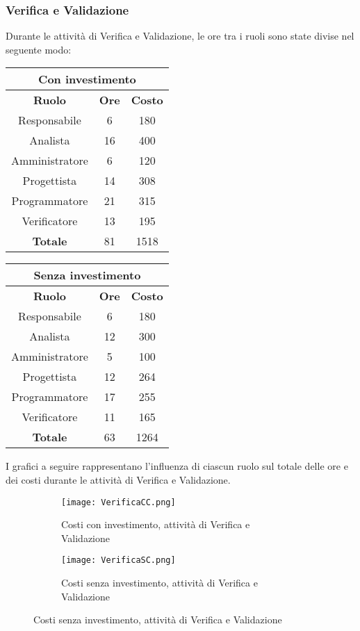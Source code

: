 \documentclass{scalatekids-article}
\begin{document}
\subsubsection{Verifica e Validazione}
Durante le attività di Verifica e Validazione, le ore tra i ruoli sono state divise nel seguente modo:
\begin{center}
  \normalsize
  \begin{tabular}{| c | c | c |}
    \hline
    \multicolumn{3}{|c|}{\textbf{Con investimento}}\\
    \hline
    \textbf{Ruolo} & \textbf{Ore} & \textbf{Costo}\\
    \hline
    Responsabile & 6 & 180 \\
    Analista & 16 & 400\\
    Amministratore & 6 & 120\\
    Progettista & 14 & 308\\
    Programmatore & 21 & 315\\
    Verificatore & 13 & 195\\
    \hline
    \textbf{Totale} & 81 & 1518\\
    \hline
  \end{tabular}
  \qquad
  \begin{tabular}{| c | c | c |}
    \hline
    \multicolumn{3}{|c|}{\textbf{Senza investimento}}\\
    \hline
    \textbf{Ruolo} & \textbf{Ore} & \textbf{Costo}\\
    \hline
    Responsabile & 6 & 180\\
    Analista & 12 & 300\\
    Amministratore & 5 & 100\\
    Progettista & 12 & 264\\
    Programmatore & 17 & 255\\
    Verificatore & 11 & 165\\
    \hline
    \textbf{Totale} & 63 & 1264\\
    \hline
  \end{tabular}
\end{center}
I grafici a seguire rappresentano l'influenza di ciascun ruolo sul totale delle ore e dei costi durante le attività di Verifica e Validazione.
\begin{figure}[H]
  \begin{subfigure}[H]{0.47\textwidth}
    \texttt{[image: VerificaCC.png]}
    \caption{Costi con investimento, attività di Verifica e Validazione}
  \end{subfigure}
  \qquad
  \begin{subfigure}[H]{0.47\textwidth}
    \texttt{[image: VerificaSC.png]}
    \caption{Costi senza investimento, attività di Verifica e Validazione}
  \end{subfigure}
\end{figure}
\newpage
\end{document}
